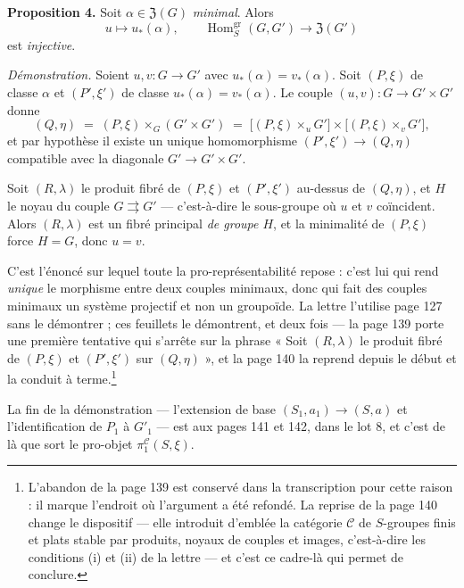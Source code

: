 \documentclass[11pt,a4paper]{article}
\begin{document}
\textbf{Proposition 4.} Soit $\alpha \in \mathfrak{Z}(G)$ \emph{minimal}. Alors
\[
  u \longmapsto u_{*}(\alpha) , \qquad
  \operatorname{Hom}^{\mathrm{gr}}_{S}(G, G') \longrightarrow \mathfrak{Z}(G')
\]
est \emph{injective}.

\emph{Démonstration.} Soient $u, v : G \to G'$ avec $u_{*}(\alpha) =
v_{*}(\alpha)$. Soit $(P, \xi)$ de classe $\alpha$ et $(P', \xi')$ de classe
$u_{*}(\alpha) = v_{*}(\alpha)$. Le couple $(u,v) : G \to G' \times G'$ donne
\[
  (Q, \eta) \;=\; (P, \xi) \times_{G} (G' \times G')
  \;=\; \bigl[(P,\xi) \times_{u} G'\bigr] \times
        \bigl[(P,\xi) \times_{v} G'\bigr] ,
\]
et par hypothèse il existe un unique homomorphisme $(P', \xi') \to (Q, \eta)$
compatible avec la diagonale $G' \to G' \times G'$.

\qquad
{}

Soit $(R, \lambda)$ le produit fibré de $(P, \xi)$ et $(P', \xi')$ au-dessus de
$(Q, \eta)$, et $H$ le noyau du couple $G \rightrightarrows G'$ ---
c'est-à-dire le sous-groupe où $u$ et $v$ coïncident. Alors $(R, \lambda)$ est
un fibré principal \emph{de groupe $H$}, et la minimalité de $(P, \xi)$ force
$H = G$, donc $u = v$.

C'est l'énoncé sur lequel toute la pro-représentabilité repose : c'est lui qui
rend \emph{unique} le morphisme entre deux couples minimaux, donc qui fait des
couples minimaux un système projectif et non un groupoïde. La lettre l'utilise
page 127 sans le démontrer ; ces feuillets le démontrent, et deux fois --- la
page 139 porte une première tentative qui s'arrête sur la phrase « Soit
$(R,\lambda)$ le produit fibré de $(P,\xi)$ et $(P',\xi')$ sur $(Q,\eta)$ », et
la page 140 la reprend depuis le début et la conduit à
terme.\footnote{L'abandon de la page 139 est conservé dans la transcription
pour cette raison : il marque l'endroit où l'argument a été refondé. La reprise
de la page 140 change le dispositif --- elle introduit d'emblée la catégorie
$\mathcal{C}$ de $S$-groupes finis et plats stable par produits, noyaux de
couples et images, c'est-à-dire les conditions (i) et (ii) de la lettre --- et
c'est ce cadre-là qui permet de conclure.}

La fin de la démonstration --- l'extension de base $(S_{1}, a_{1}) \to (S, a)$
et l'identification de $P_{1}$ à $G'_{1}$ --- est aux pages 141 et 142, dans le
lot 8, et c'est de là que sort le pro-objet
$\pi_{1}^{\mathcal{C}}(S, \xi)$.
\end{document}
